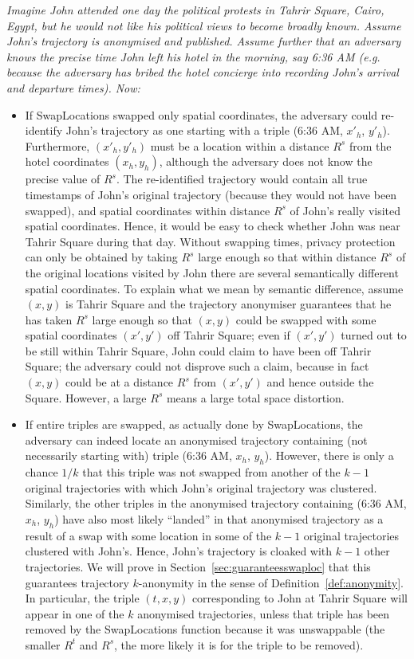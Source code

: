 \begin{example}\label{tahrir}{\em
Imagine John attended one day the political protests in Tahrir
Square, Cairo, Egypt, but he would not like his political
views to become broadly known.
Assume John's trajectory is anonymised
and published. Assume further that an adversary knows the precise time
John left his hotel in the morning, say 6:36 AM ({\em e.g.}
because the adversary has bribed the hotel concierge into recording
John's arrival and departure times). Now:
\begin{itemize}
\item If SwapLocations swapped only
spatial coordinates, the adversary could re-identify John's
trajectory as one starting with a triple (6:36 AM, $x'_h$, $y'_h$).
Furthermore, $(x'_h,y'_h)$ must be a location
within a distance $R^s$ from the hotel coordinates $(x_h,y_h)$,
although the adversary does not know the precise value of $R^s$.
The re-identified trajectory would contain all true timestamps
of John's original trajectory (because they would not have been swapped),
and spatial coordinates within distance $R^s$ of John's really visited
spatial coordinates.
Hence, it would be easy to check whether John was near Tahrir
Square during that day. Without swapping times,
privacy protection can only be obtained by taking $R^s$ large enough
so that within distance $R^s$ of the original locations visited by John there
are several semantically different spatial coordinates.
To explain
what we mean by semantic difference, assume $(x,y)$
is Tahrir Square and the trajectory
anonymiser guarantees that he has taken $R^s$ large enough
so that $(x,y)$ could be swapped
with some spatial coordinates $(x',y')$ off Tahrir Square;
even if $(x',y')$ turned out to be still within Tahrir Square, John
could claim to have been off Tahrir Square; the adversary
could not disprove such a claim, because in fact
$(x,y)$ could be at a distance $R^s$ from $(x',y')$ and hence
outside the Square.
However, a large $R^s$ means a large total space distortion.
\item If entire triples are swapped, as actually done by SwapLocations,
the adversary can indeed locate an anonymised
trajectory containing
(not necessarily starting with) triple (6:36 AM, $x_h$, $y_h$).
However, there is only a chance $1/k$ that this triple was not swapped
from another of the $k-1$ original trajectories with which John's
original trajectory was clustered.
Similarly, the other triples in the anonymised
trajectory containing (6:36 AM, $x_h$, $y_h$)
have also most likely ``landed'' in that anonymised trajectory as a result
of a swap with some location in some of the $k-1$ original trajectories
clustered with John's. Hence, John's trajectory is cloaked with $k-1$
other trajectories. We will prove in
Section~\ref{sec:guaranteesswaploc} that
this guarantees trajectory $k$-anonymity in the sense of
Definition~\ref{def:anonymity}. In particular, the triple $(t,x,y)$
corresponding to John at Tahrir Square will appear in one of the
$k$ anonymised trajectories, unless that triple has been removed
by the SwapLocations function because it was unswappable (the smaller
$R^t$ and $R^s$, the more likely it is for the triple to be removed).
\end{itemize}}
\end{example}

